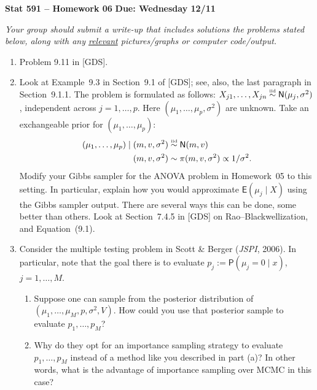 \documentclass[a4paper,12pt]{article}
\newcommand{\E}{\mathsf{E}}
\newcommand{\prob}{\mathsf{P}}
\newcommand{\iid}{\overset{\text{\tiny iid}}{\sim}}
\newcommand{\nm}{\mathsf{N}}
\begin{document}
\noindent \large \textbf{Stat 591 -- Homework 06} \hfill \textbf{Due: Wednesday 12/11} \normalsize

\medskip

\noindent \emph{Your group should submit a write-up that includes solutions the problems stated below, along with any \underline{relevant} pictures/graphs or computer code/output.}  

\medskip

\begin{enumerate}

\item Problem 9.11 in [GDS].  

\item Look at Example~9.3 in Section~9.1 of [GDS]; see, also, the last paragraph in Section~9.1.1.  The problem is formulated as follows: $X_{j1},\ldots,X_{jn} \iid \nm(\mu_j, \sigma^2)$, independent across $j=1,\ldots,p$.  Here $(\mu_1,\ldots,\mu_p, \sigma^2)$ are unknown.  Take an exchangeable prior for $(\mu_1,\ldots,\mu_p)$: 
\begin{align*}
(\mu_1,\ldots,\mu_p) \mid (m,v,\sigma^2) & \iid \nm(m,v) \\
(m,v,\sigma^2) & \sim \pi(m,v,\sigma^2) \propto 1/\sigma^2.
\end{align*}
Modify your Gibbs sampler for the ANOVA problem in Homework~05 to this setting.  In particular, explain how you would approximate $\E(\mu_j \mid X)$ using the Gibbs sampler output.  There are several ways this can be done, some better than others.  Look at Section~7.4.5 in [GDS] on Rao--Blackwellization, and Equation~(9.1).  

\item Consider the multiple testing problem in Scott \& Berger (\emph{JSPI}, 2006).  In particular, note that the goal there is to evaluate $p_j := \prob(\mu_j=0 \mid x)$, $j=1,\ldots,M$.  
\begin{enumerate}
\item Suppose one can sample from the posterior distribution of $(\mu_1,\ldots,\mu_M, p, \sigma^2, V)$.  How could you use that posterior sample to evaluate $p_1,\ldots,p_M$?  
\item Why do they opt for an importance sampling strategy to evaluate $p_1,\ldots,p_M$ instead of a method like you described in part (a)?  In other words, what is the advantage of importance sampling over MCMC in this case?  
\end{enumerate}


\end{enumerate}
\end{document}
